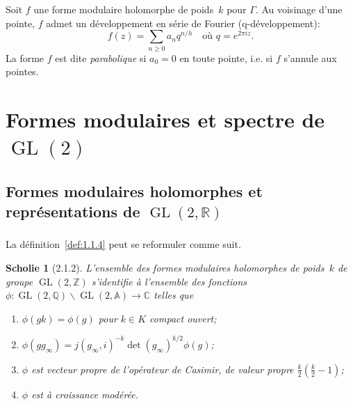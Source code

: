 \documentclass[11pt,a4paper]{amsart}
\theoremstyle{plain}
\newtheorem{scholie}[theorem]{Scholie}
\theoremstyle{definition}
\theoremstyle{remark}
\DeclareMathOperator{\GL}{GL}
\newcommand{\ZZ}{\mathbb{Z}}
\newcommand{\QQ}{\mathbb{Q}}
\newcommand{\RR}{\mathbb{R}}
\newcommand{\CC}{\mathbb{C}}
\newcommand{\Af}{\mathbb{A}}
\newcommand{\bs}{\backslash}
\begin{document}
\subsubsection{}
\label{sec:1.3.3}

Soit $f$ une forme modulaire holomorphe de poids~$k$ pour $\Gamma$. Au voisinage d'une pointe, $f$ admet un d\'eveloppement en s\'erie de Fourier (q-d\'eveloppement):
\[ f(z) = \sum_{n \geq 0} a_n q^{n/h} \quad \text{o\`u } q = e^{2\pi i z}. \]
La forme $f$ est dite \emph{parabolique} si $a_0 = 0$ en toute pointe, i.e. si $f$ s'annule aux pointes.

\section{Formes modulaires et spectre de $\GL(2)$}

\subsection{Formes modulaires holomorphes et repr\'esentations de $\GL(2,\RR)$}

\subsubsection{}
\label{sec:2.1.1}

La d\'efinition~\ref{def:1.1.4} peut se reformuler comme suit.

\begin{scholie}[2.1.2] \label{sch:2.1.2}
L'ensemble des formes modulaires holomorphes de poids~$k$ de groupe $\GL(2,\ZZ)$ s'identifie \`a l'ensemble des fonctions $\phi: \GL(2,\QQ)\bs\GL(2,\Af) \to \CC$ telles que
\begin{enumerate}
\item[(i)] $\phi(gk) = \phi(g)$ pour $k \in K$ compact ouvert;
\item[(ii)] $\phi(gg_\infty) = j(g_\infty, i)^{-k} \det(g_\infty)^{k/2} \phi(g)$;
\item[(iii)] $\phi$ est vecteur propre de l'op\'erateur de Casimir, de valeur propre $\frac{k}{2}(\frac{k}{2}-1)$;
\item[(iv)] $\phi$ est \`a croissance mod\'er\'ee.
\end{enumerate}
\end{scholie}

\subsubsection{}
\label{sec:2.1.3}
\end{document}
